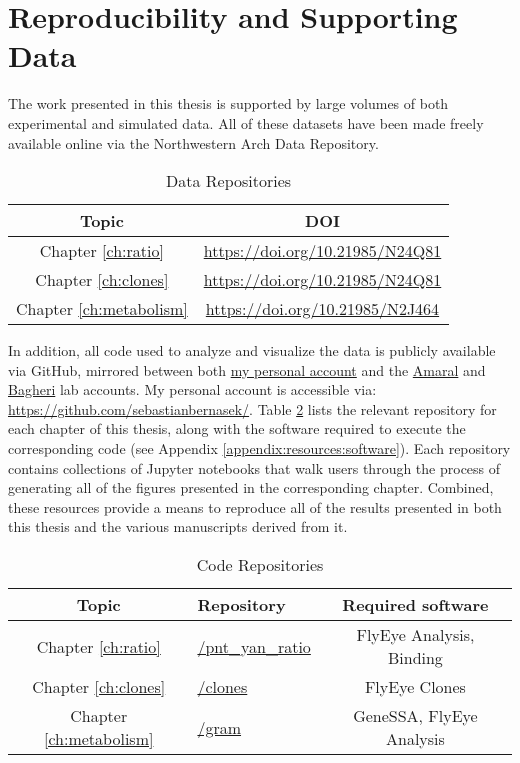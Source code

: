 \section{Reproducibility and Supporting Data}
\label{appendix:resources:reproducibility}

The work presented in this thesis is supported by large volumes of both experimental and simulated data. All of these datasets have been made freely available online via the Northwestern Arch Data Repository. 

\begin{table}[h!]
\label{appendix:resources:data_repos}
\centering
\caption{Data Repositories}
\begin{tabular}{c c}
Topic & DOI \\ [0.5ex] 
\hline
Chapter \ref{ch:ratio} & \url{https://doi.org/10.21985/N24Q81} \\
Chapter \ref{ch:clones} & \url{https://doi.org/10.21985/N24Q81} \\
Chapter \ref{ch:metabolism} & \url{https://doi.org/10.21985/N2J464} \\ [1ex] 
\end{tabular}
\end{table}

In addition, all code used to analyze and visualize the data is publicly available via GitHub, mirrored between both \href{https://github.com/sebastianbernasek/}{my personal account} and the \href{https://github.com/amarallab}{Amaral} and \href{https://github.com/bagherilab}{Bagheri} lab accounts. My personal account is accessible via: \url{https://github.com/sebastianbernasek/}. Table \ref{appendix:resources:code_repos} lists the relevant repository for each chapter of this thesis, along with the software required to execute the corresponding code (see Appendix \ref{appendix:resources:software}). Each repository contains collections of Jupyter notebooks that walk users through the process of generating all of the figures presented in the corresponding chapter. Combined, these resources provide a  means to reproduce all of the results presented in both this thesis and the various manuscripts derived from it.

\begin{table}[h!]
\label{appendix:resources:code_repos}
\centering
\caption{Code Repositories}  
\begin{tabular}{c l c} 
Topic & Repository & Required software \\ [0.5ex] 
\hline
Chapter \ref{ch:ratio} & \href{https://github.com/sebastianbernasek/pnt\_yan\_ratio}{/pnt\_yan\_ratio} &  FlyEye Analysis, Binding \\
Chapter \ref{ch:clones} & \href{https://github.com/sebastianbernasek/clones}{/clones} & FlyEye Clones \\
Chapter \ref{ch:metabolism} & \href{https://github.com/sebastianbernasek/gram}{/gram} & GeneSSA, FlyEye Analysis \\ [1ex] 
\end{tabular}
\end{table}
